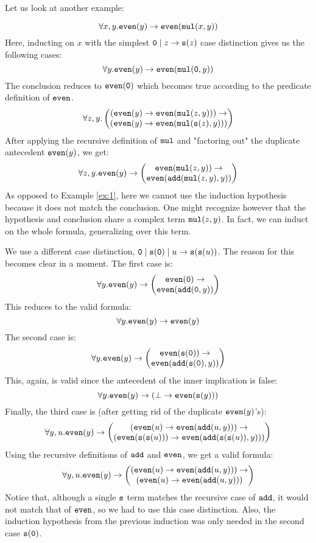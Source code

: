 Let us look at another example:
\begin{example}\label{ex:2}
	$$\forall x,y. \mathtt{even}(y)\rightarrow \mathtt{even}(\mathtt{mul}(x,y))$$
	Here, inducting on $x$ with the simplest $\mathtt{0} \mid z\rightarrow \mathtt{s}(z)$ case distinction gives us the following cases:
	$$\forall y. \mathtt{even}(y)\rightarrow \mathtt{even}(\mathtt{mul}(\mathtt{0},y))$$
	The conclusion reduces to $\mathtt{even}(\mathtt{0})$ which becomes true according to the predicate definition of $\mathtt{even}$.
	$$\forall z,y. \begin{pmatrix}(\mathtt{even}(y)\rightarrow \mathtt{even}(\mathtt{mul}(z,y)))\rightarrow\\
	(\mathtt{even}(y)\rightarrow \mathtt{even}(\mathtt{mul}(\mathtt{s}(z),y)))\end{pmatrix}$$
	After applying the recursive definition of $\mathtt{mul}$ and "factoring out" the duplicate antecedent $\mathtt{even}(y)$, we get:
	$$\forall z,y. \mathtt{even}(y)\rightarrow\begin{pmatrix}\mathtt{even}(\mathtt{mul}(z,y))\rightarrow\\
	\mathtt{even}(\mathtt{add}(\mathtt{mul}(z,y),y))\end{pmatrix}$$
	As opposed to Example \ref{ex:1}, here we cannot use the induction hypothesis because it does not match the conclusion. One might recognize however that the hypothesis and conclusion share a complex term $\mathtt{mul}(z,y)$. In fact, we can induct on the whole formula, generalizing over this term.

	We use a different case distinction, $\mathtt{0}\mid\mathtt{s}(\mathtt{0})\mid u\rightarrow\mathtt{s}(\mathtt{s}(u))$. The reason for this becomes clear in a moment. The first case is:
	$$\forall y. \mathtt{even}(y)\rightarrow\begin{pmatrix}\mathtt{even}(\mathtt{0})\rightarrow\\
	\mathtt{even}(\mathtt{add}(\mathtt{0},y))\end{pmatrix}$$
	This reduces to the valid formula:
	$$\forall y. \mathtt{even}(y)\rightarrow\mathtt{even}(y)$$
	The second case is:
	$$\forall y. \mathtt{even}(y)\rightarrow\begin{pmatrix}\mathtt{even}(\mathtt{s}(\mathtt{0}))\rightarrow\\
	\mathtt{even}(\mathtt{add}(\mathtt{s}(\mathtt{0}),y))\end{pmatrix}$$
	This, again, is valid since the antecedent of the inner implication is false:
	$$\forall y. \mathtt{even}(y)\rightarrow(\bot\rightarrow\mathtt{even}(\mathtt{s}(y)))$$
	Finally, the third case is (after getting rid of the duplicate $\mathtt{even}(y)$'s):
	$$\forall y,u. \mathtt{even}(y)\rightarrow\begin{pmatrix}(\mathtt{even}(u)\rightarrow\mathtt{even}(\mathtt{add}(u,y)))\rightarrow\\
	(\mathtt{even}(\mathtt{s}(\mathtt{s}(u)))\rightarrow\mathtt{even}(\mathtt{add}(\mathtt{s}(\mathtt{s}(u)),y)))\end{pmatrix}$$
	Using the recursive definitions of $\mathtt{add}$ and $\mathtt{even}$, we get a valid formula:
	$$\forall y,u. \mathtt{even}(y)\rightarrow\begin{pmatrix}(\mathtt{even}(u)\rightarrow\mathtt{even}(\mathtt{add}(u,y)))\rightarrow\\
	(\mathtt{even}(u)\rightarrow\mathtt{even}(\mathtt{add}(u,y)))\end{pmatrix}$$
	Notice that, although a single $\mathtt{s}$ term matches the recursive case of $\mathtt{add}$, it would not match that of $\mathtt{even}$, so we had to use this case distinction. Also, the induction hypothesis from the previous induction was only needed in the second case $\mathtt{s}(\mathtt{0})$.
\end{example}

